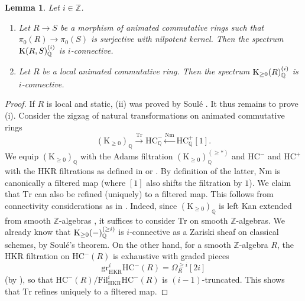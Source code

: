 \documentclass{amsart}
\numberwithin{equation}{section}
\theoremstyle{plain}
\newtheorem{lemma}[equation]{Lemma}
\theoremstyle{definition}
\let\bb=\mathbb
\def\Z{\bb Z}
\def\Q{\bb Q}
\def\ph{\mathord-}
\def\adams#1{{\smash[t]{(#1)}}}
\def\K{\mathrm{K}{}}
\def\gr{\mathrm{gr}}
\def\Fil{\mathrm{Fil}}
\newcommand{\HC}{\mathrm{HC}}
\begin{document}
\begin{lemma}\label{lem:relativeK}
	Let $i\in\Z$.
	\begin{enumerate}
		\item Let $R\to S$ be a morphism of animated commutative rings such that $\pi_0(R)\to\pi_0(S)$ is surjective with nilpotent kernel. Then the spectrum $\K(R,S)_\Q^\adams{i}$ is $i$-connective.
		\item Let $R$ be a local animated commutative ring. Then the spectrum $\K_{\geq 0}(R)_\Q^\adams{i}$ is $i$-connective.
	\end{enumerate}
\end{lemma}

\begin{proof}
	If $R$ is local and static, (ii) was proved by Soulé \cite[Section 2, Théorème 1]{Soule}. It thus remains to prove (i).
	Consider the zigzag of natural transformations on animated commutative rings
	\[
	(\K_{\geq 0})_\Q\xrightarrow{\mathrm{Tr}}\HC^-_\Q\xleftarrow{\mathrm{Nm}}\HC_\Q^+[1].
	\]
	We equip $(\K_{\geq 0})_\Q$ with the Adams filtration $(\K_{\geq 0})_\Q^{(\geq *)}$ and $\HC^-$ and $\HC^+$ with the HKR filtrations as defined in \cite[Section 6]{Raksit} or \cite[Section 6.3]{BhattLurie}. By definition of the latter, $\mathrm{Nm}$ is canonically a filtered map (where $[1]$ also shifts the filtration by $1$). We claim that $\mathrm{Tr}$ can also be refined (uniquely) to a filtered map.
	This follows from connectivity considerations as in \cite[Proposition 4.6]{ElmantoMorrow}. Indeed, since $(\K_{\geq 0})_\Q$ is left Kan extended from smooth $\Z$-algebras \cite[Example A.0.6]{EHKSY3}, it suffices to consider $\mathrm{Tr}$ on smooth $\Z$-algebras.
	We already know that $\K_{\geq 0}(\ph)_\Q^\adams{\geq i}$ is $i$-connective as a Zariski sheaf on classical schemes, by Soulé's theorem. On the other hand, for a smooth $\Z$-algebra $R$, the HKR filtration on $\HC^-(R)$ is exhaustive with graded pieces 
	\[\gr^i_\mathrm{HKR}\HC^-(R)=\Omega^{\geq i}_R[2i]\] 
	(by \cite[Example 6.3.8]{Raksit}), so that $\HC^-(R)/\Fil_\mathrm{HKR}^{i}\HC^-(R)$ is $(i-1)$-truncated. 
	This shows that $\mathrm{Tr}$ refines uniquely to a filtered map.
	

\end{proof}
\end{document}
